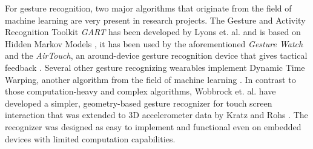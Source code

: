 For gesture recognition, two major algorithms that originate from the field of machine learning are very present in research projects. The Gesture and Activity Recognition Toolkit \textit{GART} has been developed by Lyons et. al. and is based on Hidden Markov Models \cite{Lyons2012}, it has been used by the aforementioned \textit{Gesture Watch}\cite{Kim2007} and the \textit{AirTouch}, an around-device gesture recognition device that gives tactical feedback \cite{Lee2011}. Several other gesture recognizing wearables implement Dynamic Time Warping, another algorithm from the field of machine learning \cite{Ashbrook2010} \cite{Liu2009}. In contrast to those computation-heavy and complex algorithms, Wobbrock et. al. have developed a simpler, geometry-based gesture recognizer for touch screen interaction \cite{Wobbrock2007} that was extended to 3D accelerometer data by Kratz and Rohs \cite{Kratz2010}. The recognizer was designed as easy to implement and functional even on embedded devices with limited computation capabilities.